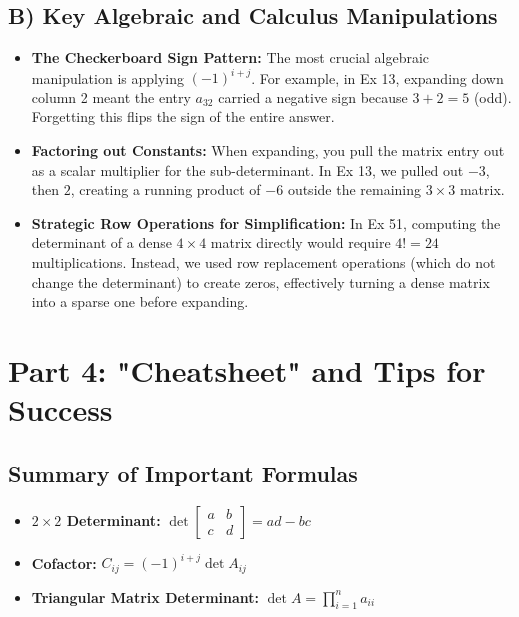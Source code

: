 \documentclass{article}
\begin{document}
\subsection{B) Key Algebraic and Calculus Manipulations}
\begin{itemize}
    \item \textbf{The Checkerboard Sign Pattern:} The most crucial algebraic manipulation is applying $(-1)^{i+j}$. For example, in Ex 13, expanding down column 2 meant the entry $a_{32}$ carried a negative sign because $3+2=5$ (odd). Forgetting this flips the sign of the entire answer.
    \item \textbf{Factoring out Constants:} When expanding, you pull the matrix entry out as a scalar multiplier for the sub-determinant. In Ex 13, we pulled out $-3$, then $2$, creating a running product of $-6$ outside the remaining $3 \times 3$ matrix.
    \item \textbf{Strategic Row Operations for Simplification:} In Ex 51, computing the determinant of a dense $4 \times 4$ matrix directly would require $4! = 24$ multiplications. Instead, we used row replacement operations (which do not change the determinant) to create zeros, effectively turning a dense matrix into a sparse one before expanding.
\end{itemize}

\section{Part 4: "Cheatsheet" and Tips for Success}

\subsection{Summary of Important Formulas}
\begin{itemize}
    \item \textbf{$2 \times 2$ Determinant:} $\det \begin{bmatrix} a & b \\ c & d \end{bmatrix} = ad - bc$
    \item \textbf{Cofactor:} $C_{ij} = (-1)^{i+j} \det A_{ij}$
    \item \textbf{Triangular Matrix Determinant:} $\det A = \prod_{i=1}^n a_{ii}$
\end{itemize}
\end{document}
